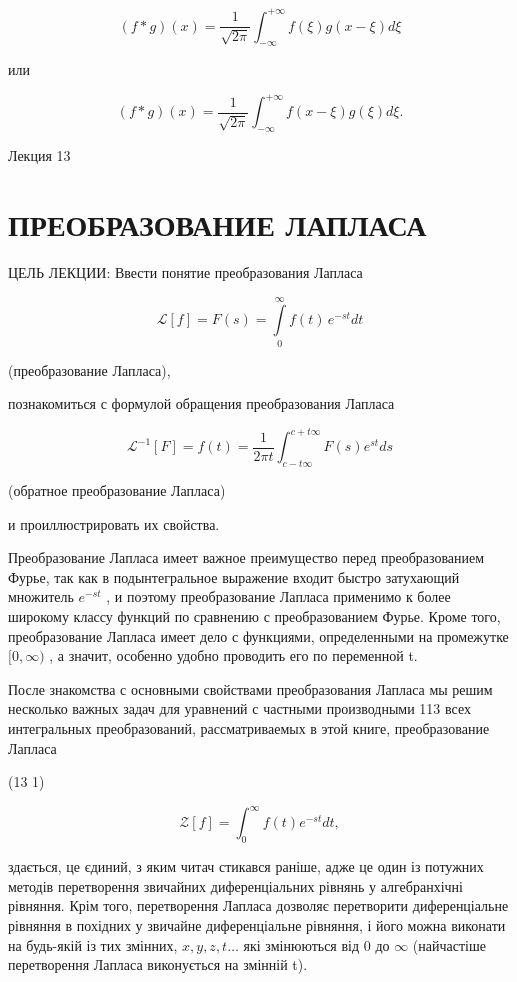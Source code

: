 \documentclass[
  ukrainian,
]{article}
\begin{document}
\[
(f * g)(x) = \frac{1}{\sqrt{2\pi}} \int_{-\infty}^{+\infty} f(\xi) g(x - \xi) d\xi
\]

или

\[
(f * g)(x) = \frac{1}{\sqrt{2\pi}} \int_{-\infty}^{+\infty} f(x-\xi) g(\xi) d\xi.
\]

Лекция 13

\section{ПРЕОБРАЗОВАНИЕ
ЛАПЛАСА}\label{ux43fux440ux435ux43eux431ux440ux430ux437ux43eux432ux430ux43dux438ux435-ux43bux430ux43fux43bux430ux441ux430}

ЦЕЛЬ ЛЕКЦИИ: Ввести понятие преобразования Лапласа

\[
\mathscr{L}[f] = F(s) = \int\limits_0^\infty f(t)\,e^{-st}dt
\]

(преобразование Лапласа),

познакомиться с формулой обращения преобразования Лапласа

\[
\mathscr{L}^{-1}[F] = f(t) = \frac{1}{2\pi t} \int_{c-t\infty}^{c+t\infty} F(s) e^{st} ds
\]

(обратное преобразование Лапласа)

и проиллюстрировать их свойства.

Преобразование Лапласа имеет важное преимущество перед преобразованием
Фурье, так как в подынтегральное выражение входит быстро затухающий
множитель \(e^{-st}\) , и поэтому преобразование Лапласа применимо к
более широкому классу функций по сравнению с преобразованием Фурье.
Кроме того, преобразование Лапласа имеет дело с функциями, определенными
на промежутке \([0, \infty)\) , а значит, особенно удобно проводить его
по переменной t.

После знакомства с основными свойствами преобразования Лапласа мы решим
несколько важных задач для уравнений с частными производными 113 всех
интегральных преобразований, рассматриваемых в этой книге,
преобразование Лапласа

(13 1)

\[
\mathscr{Z}[f] = \int_{0}^{\infty} f(t) e^{-st} dt,
\]

здається, це єдиний, з яким читач стикався раніше, адже це один із
потужних методів перетворення звичайних диференціальних рівнянь у
алгебранхічні рівняння. Крім того, перетворення Лапласа дозволяє
перетворити диференціальне рівняння в похідних у звичайне диференціальне
рівняння, і його можна виконати на будь-якій із тих змінних,
\(x, y, z, t \ldots\) які змінюються від 0 до \(\infty\) (найчастіше
перетворення Лапласа виконується на змінній t).
\end{document}
